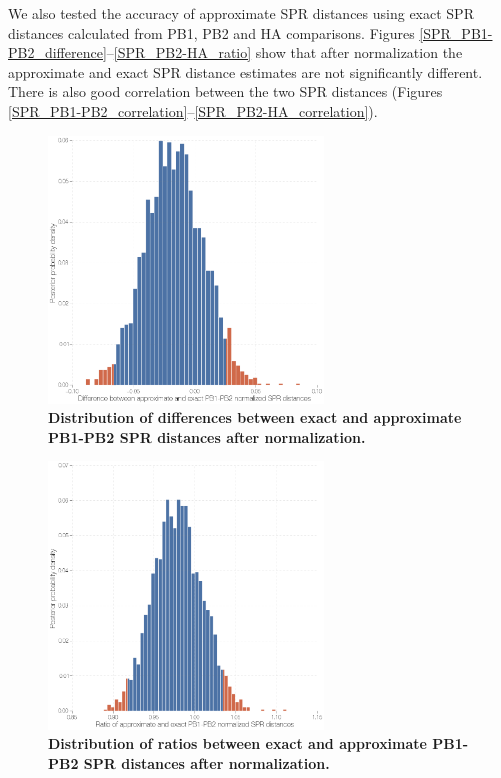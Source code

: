 \documentclass[11pt,oneside,letterpaper]{article}
\begin{document}
We also tested the accuracy of approximate SPR distances using exact SPR distances calculated from PB1, PB2 and HA comparisons.
Figures \ref{SPR_PB1-PB2_difference}--\ref{SPR_PB2-HA_ratio} show that after normalization the approximate and exact SPR distance estimates are not significantly different.
There is also good correlation between the two SPR distances (Figures \ref{SPR_PB1-PB2_correlation}--\ref{SPR_PB2-HA_correlation}). 

\begin{figure}
\centering  
\includegraphics[width=0.65\textwidth]  {supp_figures/InfB_supp_NormPB1-PB2_hist.png}
\caption{\textbf{Distribution of differences between exact and approximate PB1-PB2 SPR distances after normalization.}}
\label{NormSPR_PB1-PB2_difference}
\end{figure}

\begin{figure}
\centering  
\includegraphics[width=0.65\textwidth]  {supp_figures/InfB_supp_NormPB1-PB2_hist2.png}
\caption{\textbf{Distribution of ratios between exact and approximate PB1-PB2 SPR distances after normalization.}}
\label{NormSPR_PB1-PB2_ratio}
\end{figure}
\end{document}
